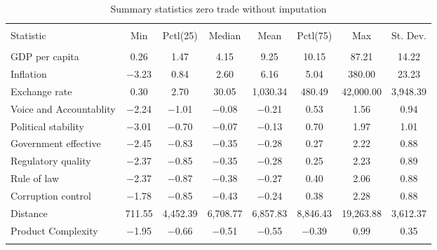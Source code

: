 
\begin{table}[H] \centering 
  \caption{Summary statistics zero trade without imputation} 
  \label{fig:sum_notrade_noimp} 
\begin{tabular}{@{\extracolsep{5pt}}lccccccc} 
\\[-1.8ex]\hline 
\hline \\[-1.8ex] 
Statistic & \multicolumn{1}{c}{Min} & \multicolumn{1}{c}{Pctl(25)} & \multicolumn{1}{c}{Median} & \multicolumn{1}{c}{Mean} & \multicolumn{1}{c}{Pctl(75)} & \multicolumn{1}{c}{Max} & \multicolumn{1}{c}{St. Dev.} \\ 
\hline \\[-1.8ex] 
GDP per capita & 0.26 & 1.47 & 4.15 & 9.25 & 10.15 & 87.21 & 14.22 \\ 
Inflation & $-$3.23 & 0.84 & 2.60 & 6.16 & 5.04 & 380.00 & 23.23 \\ 
Exchange rate & 0.30 & 2.70 & 30.05 & 1,030.34 & 480.49 & 42,000.00 & 3,948.39 \\ 
Voice and Accountablity & $-$2.24 & $-$1.01 & $-$0.08 & $-$0.21 & 0.53 & 1.56 & 0.94 \\ 
Political stability & $-$3.01 & $-$0.70 & $-$0.07 & $-$0.13 & 0.70 & 1.97 & 1.01 \\ 
Government effective & $-$2.45 & $-$0.83 & $-$0.35 & $-$0.28 & 0.27 & 2.22 & 0.88 \\ 
Regulatory quality & $-$2.37 & $-$0.85 & $-$0.35 & $-$0.28 & 0.25 & 2.23 & 0.89 \\ 
Rule of law & $-$2.37 & $-$0.87 & $-$0.38 & $-$0.27 & 0.40 & 2.06 & 0.88 \\ 
Corruption control & $-$1.78 & $-$0.85 & $-$0.43 & $-$0.24 & 0.38 & 2.28 & 0.88 \\ 
Distance & 711.55 & 4,452.39 & 6,708.77 & 6,857.83 & 8,846.43 & 19,263.88 & 3,612.37 \\ 
Product Complexity & $-$1.95 & $-$0.66 & $-$0.51 & $-$0.55 & $-$0.39 & 0.99 & 0.35 \\ 
\hline \\[-1.8ex] 
\end{tabular} 
\end{table} 
